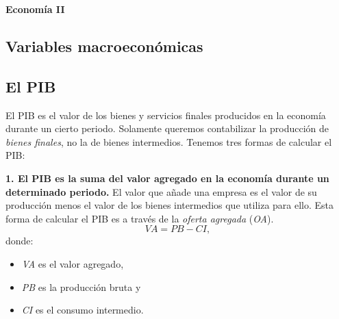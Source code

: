 \documentclass[10pt, landscape]{article}
\title{}
\begin{document}

\footnotesize

\begin{center}
     \Large{\textbf{Economía II}} \\
\end{center}
\begin{multicols*}{3}
\setlength{\premulticols}{1pt}
\setlength{\postmulticols}{1pt}
\setlength{\multicolsep}{1pt}
\setlength{\columnsep}{2pt}

\setlength{\abovedisplayskip}{0.25em}
\setlength{\belowdisplayskip}{0.25em}
\setlength{\abovedisplayshortskip}{0.25em}
\setlength{\belowdisplayshortskip}{0.25em}

\section{Variables macroeconómicas}
\subsection{El PIB}
El PIB es el valor de los bienes y servicios finales producidos en la economía durante un cierto periodo. Solamente queremos contabilizar la producción de \textit{bienes finales}, no la de bienes intermedios. Tenemos tres formas de calcular el PIB:

\textbf{1. El PIB es la suma del valor agregado en la economía durante un determinado periodo.} El valor que añade una empresa es el valor de su producción menos el valor de los bienes intermedios que utiliza para ello. Esta forma de calcular el PIB es a través de la \textit{oferta agregada} (\textit{OA}).
\[ \textit{VA} = \textit{PB} - \textit{CI}, \]
donde:
\begin{itemize}
    \item \textit{VA} es el valor agregado,
    \item \textit{PB} es la producción bruta y
    \item \textit{CI} es el consumo intermedio.
\end{itemize}


\end{multicols*}
\end{document}
